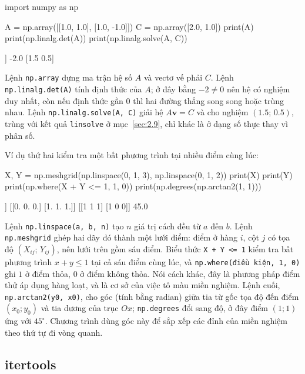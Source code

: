 \documentclass[12pt,a4paper]{report}
\begin{document}
\begin{madoanbox}
import numpy as np

A = np.array([[1.0, 1.0],
              [1.0, -1.0]])
C = np.array([2.0, 1.0])
print(A)
print(np.linalg.det(A))
print(np.linalg.solve(A, C))
\end{madoanbox}

\begin{ketquabox}[Kết quả chạy chương trình]
[[ 1.  1.]
 [ 1. -1.]]
-2.0
[1.5 0.5]
\end{ketquabox}

Lệnh \texttt{np.array} dựng ma trận hệ số $A$ và vectơ vế phải $C$. Lệnh \texttt{np.linalg.det(A)} tính định thức của $A$; ở đây bằng $-2\ne 0$ nên hệ có nghiệm duy nhất, còn nếu định thức gần $0$ thì hai đường thẳng song song hoặc trùng nhau. Lệnh \texttt{np.linalg.solve(A, C)} giải hệ $A\mathbf{v}=C$ và cho nghiệm $(1.5;\,0.5)$, trùng với kết quả \texttt{linsolve} ở mục~\ref{sec:2.9}, chỉ khác là ở dạng số thực thay vì phân số.

Ví dụ thứ hai kiểm tra một bất phương trình tại nhiều điểm cùng lúc:

\begin{madoanbox}
X, Y = np.meshgrid(np.linspace(0, 1, 3), np.linspace(0, 1, 2))
print(X)
print(Y)
print(np.where(X + Y <= 1, 1, 0))
print(np.degrees(np.arctan2(1, 1)))
\end{madoanbox}

\begin{ketquabox}[Kết quả chạy chương trình]
[[0.  0.5 1. ]
 [0.  0.5 1. ]]
[[0. 0. 0.]
 [1. 1. 1.]]
[[1 1 1]
 [1 0 0]]
45.0
\end{ketquabox}

Lệnh \texttt{np.linspace(a, b, n)} tạo $n$ giá trị cách đều từ $a$ đến $b$. Lệnh \texttt{np.meshgrid} ghép hai dãy đó thành một lưới điểm: điểm ở hàng $i$, cột $j$ có tọa độ $(X_{ij};\,Y_{ij})$, nên lưới trên gồm sáu điểm. Biểu thức \texttt{X + Y <= 1} kiểm tra bất phương trình $x+y\le 1$ tại cả sáu điểm cùng lúc, và \texttt{np.where(điều kiện, 1, 0)} ghi $1$ ở điểm thỏa, $0$ ở điểm không thỏa. Nói cách khác, đây là phương pháp điểm thử áp dụng hàng loạt, và là cơ sở của việc tô màu miền nghiệm. Lệnh cuối, \texttt{np.arctan2(y0, x0)}, cho góc (tính bằng radian) giữa tia từ gốc tọa độ đến điểm $(x_0;y_0)$ và tia dương của trục $Ox$; \texttt{np.degrees} đổi sang độ, ở đây điểm $(1;1)$ ứng với $45^\circ$. Chương trình dùng góc này để sắp xếp các đỉnh của miền nghiệm theo thứ tự đi vòng quanh.

\subsection*{itertools}
\end{document}

